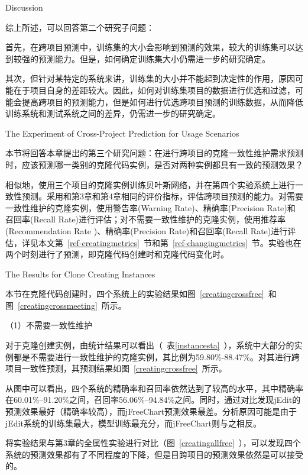 {Discussion}

综上所述，可以回答第二个研究子问题：

首先，在跨项目预测中，训练集的大小会影响到预测的效果，较大的训练集可以达到较强的预测能力。但是，如何确定训练集大小仍需进一步的研究确定。

其次，但针对某特定的系统来讲，训练集的大小并不能起到决定性的作用，原因可能在于项目自身的差距较大。因此，如何对训练集项目的数据进行优选和过滤，可能会提高跨项目的预测能力，但是如何进行优选跨项目预测的训练数据，从而降低训练系统和测试系统之间的差异，仍需进一步的研究确定。

{The Experiment of Cross-Project Prediction for Usage Scenarios}

本节将回答本章提出的第三个研究问题：在进行跨项目的克隆一致性维护需求预测时，应该预测哪一类别的克隆代码实例，是否对两种实例都具有一致的预测效果？

相似地，使用三个项目的克隆实例训练贝叶斯网络，并在第四个实验系统上进行一致性预测。采用和第3章和第4章相同的评价指标，评估跨项目预测的能力。对需要一致性维护的克隆实例，使用警告率(Warning Rate)、精确率(Precision Rate)和召回率(Recall Rate)进行评估；对不需要一致性维护的克隆实例，使用推荐率(Recommendation Rate )、精确率(Precision Rate)和召回率(Recall Rate)进行评估，详见本文第~\ref{ref-creatingmetrics}~节和第~\ref{ref-changingmetrics}~节。实验也在两个时刻进行了预测，即克隆代码创建时和克隆代码变化时。

{The Results for Clone Creating Instances}

本节在克隆代码创建时，四个系统上的实验结果如图~\ref{creatingcrossfree}~和图~\ref{creatingcrossmeeting}~所示。

（1）不需要一致性维护

对于克隆创建实例，由统计结果可以看出（~表\ref{instancesta}~），系统中大部分的实例都是不需要进行一致性维护的克隆实例，其比例为59.80\%-88.47\%。对其进行跨项目一致性预测，其预测结果如图~\ref{creatingcrossfree}~所示。

从图中可以看出，四个系统的精确率和召回率依然达到了较高的水平，其中精确率在60.01\%--91.20\%之间，召回率56.06\%--94.84\%之间。同时，通过对比发现jEdit的预测效果最好（精确率较高），而jFreeChart预测效果最差。分析原因可能是由于jEdit系统的训练集最大，模型训练最充分，而jFreeChart则与之相反。

将实验结果与第3章的全属性实验进行对比（图~\ref{creatingallfree}~），可以发现四个系统的预测效果都有了不同程度的下降，但是目跨项目的预测效果依然是可以接受的。

